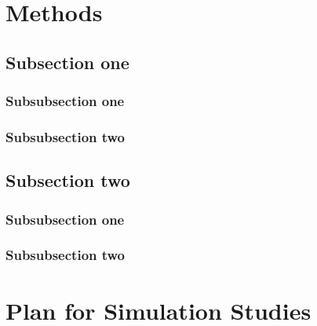 \documentclass[12pt]{article}
\begin{document}
\newpage
\section{Methods}\label{sec:method}


\subsection{Subsection one}\label{sec:subsec1}


\subsubsection{Subsubsection one}\label{sec:subsub1-1}

\subsubsection{Subsubsection two}\label{sec:subsub1-2}


\subsection{Subsection two}\label{sec:subsec2}


\subsubsection{Subsubsection one}\label{sec:subsub2-1}



\subsubsection{Subsubsection two}\label{sec:subsub2-2}


\newpage
\section{Plan for Simulation Studies}\label{sec:simulation}
\end{document}
